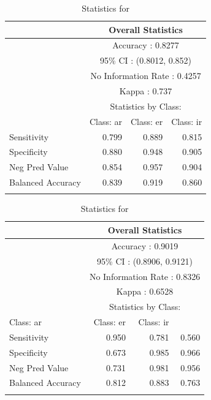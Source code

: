 \begin{table}
  \centering
    \begin{tabular}{lrrr}
      \lsptoprule
      & \multicolumn{3}{c}{Overall Statistics}                \\
      \midrule
      & \multicolumn{3}{c}{Accuracy : 0.8277}                 \\
      & \multicolumn{3}{c}{95\% CI : (0.8012, 0.852)}         \\
      & \multicolumn{3}{c}{No Information Rate : 0.4257}      \\
      & \multicolumn{3}{c}{Kappa : 0.737}                     \\
      \midrule
      & \multicolumn{3}{c}{Statistics by Class:}              \\
      \midrule
   & Class: ar & Class: er & Class: ir \\
      \midrule
      Sensitivity       & 0.799     & 0.889     & 0.815     \\
      Specificity       & 0.880     & 0.948     & 0.905     \\
      Neg Pred Value    & 0.854     & 0.957     & 0.904     \\
      Balanced Accuracy & 0.839     & 0.919     & 0.860     \\
      \lspbottomrule
    \end{tabular}
    \caption{Statistics for }
    \label{tab:spanish-verbs-theme-v-stats}
\end{table}

\begin{table}
    \begin{tabular}{lrrr}
      \lsptoprule
      &\multicolumn{3}{c}{Overall Statistics}                \\
      \midrule
      & \multicolumn{3}{c}{Accuracy : 0.9019}                 \\
      & \multicolumn{3}{c}{95\% CI : (0.8906, 0.9121)}         \\
      & \multicolumn{3}{c}{No Information Rate : 0.8326}      \\
      & \multicolumn{3}{c}{Kappa : 0.6528}                     \\
      \midrule
      & \multicolumn{3}{c}{Statistics by Class:}              \\
      \midrule
   Class: ar & Class: er & Class: ir \\
      \midrule
      Sensitivity       & 0.950&   0.781&   0.560\\
      Specificity       & 0.673&   0.985&   0.966\\
      Neg Pred Value    & 0.731&   0.981&   0.956\\
      Balanced Accuracy & 0.812&   0.883&   0.763\\
      \lspbottomrule
    \end{tabular}
    \caption{Statistics for }
    \label{tab:spanish-verbs-theme-v-stats-2}
\end{table}
\clearpage  

